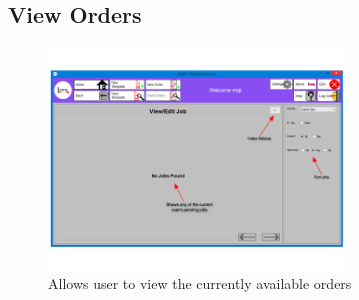 \documentclass[oneside,openany,11pt,a4paper]{report}
\begin{document}
\subsection{View Orders}
\begin{figure}[H]
	\centering
	\includegraphics[width=0.7\textwidth]{screen/vieworders.png}
	\caption{Allows user to view the currently available orders}
\end{figure}
\end{document}

